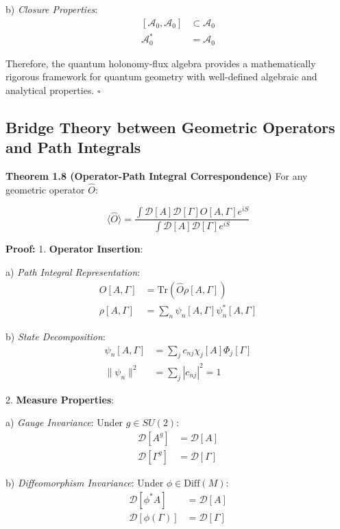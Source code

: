 \documentclass[12pt,a4paper]{article}
\begin{document}
   b) \textit{Closure Properties}:
      \[
      \begin{aligned}
      [\mathcal{A}_0, \mathcal{A}_0] &\subset \mathcal{A}_0 \\
      \mathcal{A}_0^* &= \mathcal{A}_0
      \end{aligned}
      \]

Therefore, the quantum holonomy-flux algebra provides a mathematically rigorous framework for quantum geometry with well-defined algebraic and analytical properties. $\square$

\subsection{Bridge Theory between Geometric Operators and Path Integrals}

\textbf{Theorem 1.8 (Operator-Path Integral Correspondence)}
For any geometric operator $\hat{O}$:

\[
\langle\hat{O}\rangle = \frac{\int \mathcal{D}[A]\mathcal{D}[\Gamma] O[A,\Gamma]e^{iS}}{\int \mathcal{D}[A]\mathcal{D}[\Gamma] e^{iS}}
\]

\textbf{Proof:}
1. \textbf{Operator Insertion}:
   
   a) \textit{Path Integral Representation}:
      \[
      \begin{aligned}
      O[A,\Gamma] &= \text{Tr}(\hat{O}\rho[A,\Gamma]) \\
      \rho[A,\Gamma] &= \sum_n \psi_n[A,\Gamma]\psi_n^*[A,\Gamma]
      \end{aligned}
      \]
   
   b) \textit{State Decomposition}:
      \[
      \begin{aligned}
      \psi_n[A,\Gamma] &= \sum_j c_{nj}\chi_j[A]\Phi_j[\Gamma] \\
      \|\psi_n\|^2 &= \sum_j |c_{nj}|^2 = 1
      \end{aligned}
      \]

2. \textbf{Measure Properties}:
   
   a) \textit{Gauge Invariance}:
      Under $g \in SU(2)$:
      \[
      \begin{aligned}
      \mathcal{D}[A^g] &= \mathcal{D}[A] \\
      \mathcal{D}[\Gamma^g] &= \mathcal{D}[\Gamma]
      \end{aligned}
      \]
   
   b) \textit{Diffeomorphism Invariance}:
      Under $\phi \in \text{Diff}(M)$:
      \[
      \begin{aligned}
      \mathcal{D}[\phi^*A] &= \mathcal{D}[A] \\
      \mathcal{D}[\phi(\Gamma)] &= \mathcal{D}[\Gamma]
      \end{aligned}
      \]
\end{document}
